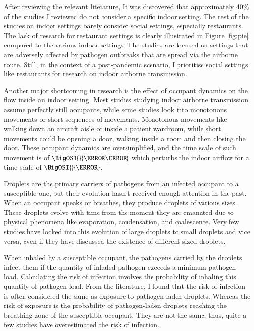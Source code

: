 \documentclass[a4paper,12pt]{elsarticle}
\begin{document}
After reviewing the relevant literature, It was discovered that approximately 40\% of the studies I reviewed do not consider a specific indoor setting. The rest of the studies on indoor settings barely consider social settings, especially restaurants. The lack of research for restaurant settings is clearly illustrated in Figure \ref{fig:pie} compared to the various indoor settings. The studies are focused on settings that are adversely affected by pathogen outbreaks that are spread via the airborne route. Still, in the context of a post-pandemic scenario, I prioritise social settings like restaurants for research on indoor airborne transmission. 

Another major shortcoming in research is the effect of occupant dynamics on the flow inside an indoor setting. Most studies studying indoor airborne transmission assume perfectly still occupants, while some studies look into monotonous movements or short sequences of movements. Monotonous movements like walking down an aircraft aisle or inside a patient wardroom, while short movements could be opening a door, walking inside a room and then closing the door. These occupant dynamics are oversimplified, and the time scale of such movement is of $\BigOSI{}{\milli\second}$ which perturbs the indoor airflow for a time scale of $\BigOSI{}{\second}$.

Droplets are the primary carriers of pathogens from an infected occupant to a susceptible one, but their evolution hasn't received enough attention in the past. When an occupant speaks or breathes, they produce droplets of various sizes. These droplets evolve with time from the moment they are emanated due to physical phenomena like evaporation, condensation, and coalescence. Very few studies have looked into this evolution of large droplets to small droplets and vice versa, even if they have discussed the existence of different-sized droplets.

When inhaled by a susceptible occupant, the pathogens carried by the droplets infect them if the quantity of inhaled pathogen exceeds a minimum pathogen load. Calculating the risk of infection involves the probability of inhaling this quantity of pathogen load. From the literature, I found that the risk of infection is often considered the same as exposure to pathogen-laden droplets. Whereas the risk of exposure is the probability of pathogen-laden droplets reaching the breathing zone of the susceptible occupant. They are not the same; thus, quite a few studies have overestimated the risk of infection.
\end{document}

